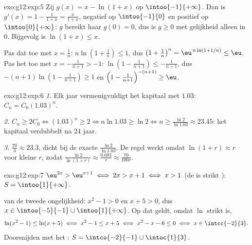 \begin{solution}{exo:g12:exp:5}
Zij $g(x) = x - \ln(1+x)$ op $\intoo{-1}{+\infty}$. Dan is
$g'(x) = 1 - \frac{1}{1+x} = \frac{x}{1+x}$, negatief op $\intoo{-1}{0}$ en
positief op $\intoo{0}{+\infty}$: $g$ bereikt haar  $g(0) = 0$, dus is
$g \geq 0$ met gelijkheid alleen in $0$. Bijgevolg is $\ln(1+x) \leq x$.

Pas dat toe met $x = \frac1n$: $n\ln\left(1 + \frac1n\right) \leq 1$, dus
$\left(1+\frac1n\right)^n = \eu^{\,n\ln(1+1/n)} \leq \eu$. Pas het toe met
$x = -\frac{1}{n+1} > -1$: $\ln\left(1 - \frac{1}{n+1}\right) \leq
-\frac{1}{n+1}$, dus $-(n+1)\ln\left(1 - \frac{1}{n+1}\right) \geq 1$ en
$\left(1 - \frac{1}{n+1}\right)^{-(n+1)} \geq \eu$.
\end{solution}

\begin{solution}{exo:g12:exp:6}
\emph{1.} Elk jaar vermenigvuldigt het kapitaal met $1.03$:
$C_n = C_0 (1.03)^n$.

\emph{2.} $C_n \geq 2C_0 \iff (1.03)^n \geq 2 \iff n \ln 1.03 \geq \ln 2
\iff n \geq \frac{\ln 2}{\ln 1.03} \approx 23.45$: het kapitaal verdubbelt na
$24$ jaar.

\emph{3.} $\frac{70}{3} \approx 23.3$, dicht bij de exacte
$\frac{\ln 2}{\ln 1.03}$. De regel werkt omdat $\ln(1 + r) \approx r$ voor
kleine $r$, zodat $\frac{\ln 2}{\ln(1+r)} \approx \frac{0.693}{r} \approx
\frac{70}{100r}$.
\end{solution}

\begin{solution}{exo:g12:exp:7}
$\eu^{2x} > \eu^{x+1} \iff 2x > x + 1 \iff x > 1$ (de  is
strikt ): $S = \intoo{1}{+\infty}$.

 van de tweede ongelijkheid: $x^2 - 1 > 0$ en $x + 5 > 0$, dus
$x \in \intoo{-5}{-1} \cup \intoo{1}{+\infty}$. Op dat  geldt, omdat
$\ln$ strikt  is,
\[
\ln(x^2-1) \leq \ln(x+5) \iff x^2 - 1 \leq x + 5 \iff x^2 - x - 6 \leq 0
\iff x \in \intcc{-2}{3}.
\]
Doorsnijden met het : $S = \intco{-2}{-1} \cup \intoc{1}{3}$.
\end{solution}

